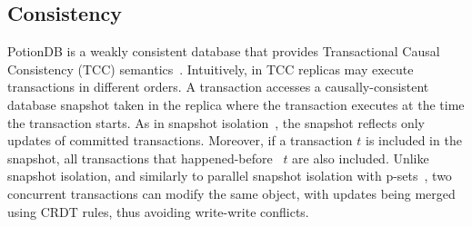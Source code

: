 \documentclass[sigplan,twocolumn,review,anonymous]{acmart}
\begin{document}



\subsection{Consistency}
\label{sec:consistency}

PotionDB is a weakly consistent database that provides Transactional Causal Consistency (TCC) 
semantics~\cite{cure,Wu20Transactional,walter}.
Intuitively, in TCC replicas may execute transactions in different orders.
A transaction accesses a causally-consistent database snapshot taken in the replica where the transaction executes
at the time the transaction starts. 
As in snapshot isolation~\cite{Berenson95Critique}, the snapshot reflects only updates of committed transactions.   
Moreover, if a transaction $t$ is included in the snapshot, all transactions that 
happened-before~\cite{lamport78}  $t$ are also included.
Unlike snapshot isolation, and similarly to parallel snapshot isolation with p-sets~\cite{walter}, %
two concurrent transactions can modify the same object, with updates
being merged using CRDT rules, 
thus avoiding write-write conflicts. %
\end{document}
